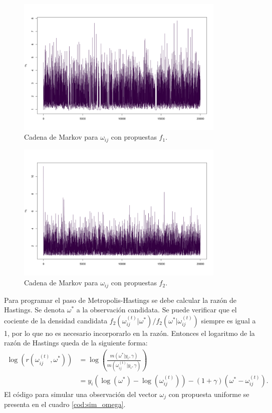 \documentclass[11pt,a4paper]{article}
\begin{document}
\begin{figure}[!htb]
\centering\includegraphics[width=10cm]{propuesta_gamma.png}
\caption{Cadena de Markov para $\omega_{ij}$ con propuestas $f_1$.}
\label{fig:prop_gamma}
\end{figure}

\begin{figure}[!htb]
\centering\includegraphics[width=10cm]{propuesta_uniforme.png}
\caption{Cadena de Markov para $\omega_{ij}$ con propuestas $f_2$.}
\label{fig:prop_unif}
\end{figure}

Para programar el paso de Metropolis-Hastings se debe calcular la razón de Hastings. Se denota $\omega^*$ a la observación candidata. Se puede verificar que el cociente de la densidad candidata $f_2(\omega_{ij} ^{(t)} | \omega^*)/f_2(\omega^* | \omega_{ij} ^{(t)})$ siempre es igual a 1, por lo que no es necesario incorporarlo en la razón. Entonces el logaritmo de la razón de Hastings queda de la siguiente forma:
\begin{align*}
\log (r(\omega_{ij}^{(t)}, \omega^*)) &= \log \left(\frac{m(\omega^* | y_i, \gamma)}{m(\omega_{ij}^{(t)}| y_i, \gamma)}\right)\\
&= y_i \left(\log (\omega^*) - \log (\omega_{ij}^{(t)})\right) - (1 + \gamma)(\omega^* - \omega_{ij}^{(t)}).
\end{align*}
El código para simular una observación del vector $\omega_j$ con propuesta uniforme se presenta en el cuadro \ref{cod:sim_omega}.
\newpage
\end{document}
